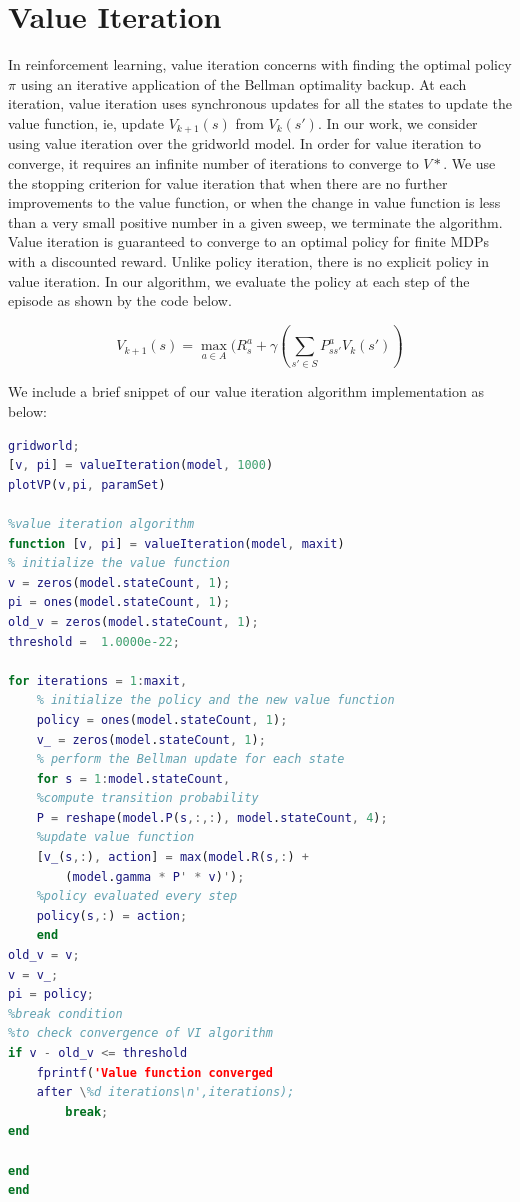 \documentclass{article}\usepackage[]{graphicx}\usepackage[]{color}
\let\Oldsection\section
\renewcommand{\section}{\FloatBarrier\Oldsection}
\theoremstyle{plain}
\begin{document}
\section{Value Iteration}

\noindent
In reinforcement learning, value iteration concerns with finding the optimal policy $\pi$ using an iterative application of the Bellman optimality backup. At each iteration, value iteration uses synchronous updates for all the states to update the value function, ie, update $V_{k+1}(s)$ from $V_k(s')$.  In our work, we consider using value iteration over the gridworld model. In order for value iteration to converge, it requires an infinite number of iterations to converge to $V*$. We use the stopping criterion for value iteration that when there are no further improvements to the value function, or when the change in value function is less than a very small positive number in a given sweep, we terminate the algorithm. Value iteration is guaranteed to converge to an optimal policy for finite MDPs with a discounted reward. Unlike policy iteration, there is no explicit policy in value iteration. In our algorithm, we evaluate the policy at each step of the episode as shown by the code below.

\begin{equation}
    V_{k+1}(s) = \max_{a \in A} (R_s^{a} + \gamma (\sum_{s' \in S} P_{ss'}^{a} V_{k}(s'))
\end{equation}


\noindent
We include a brief snippet of our value iteration algorithm implementation as below:


\begin{lstlisting}[language=Matlab, caption=Value Iteration Algorithm]
% run VI on GridWorld
gridworld;
[v, pi] = valueIteration(model, 1000)
plotVP(v,pi, paramSet)

%value iteration algorithm
function [v, pi] = valueIteration(model, maxit)
% initialize the value function
v = zeros(model.stateCount, 1);
pi = ones(model.stateCount, 1);
old_v = zeros(model.stateCount, 1);
threshold =  1.0000e-22;

for iterations = 1:maxit,
    % initialize the policy and the new value function
    policy = ones(model.stateCount, 1);
    v_ = zeros(model.stateCount, 1);
    % perform the Bellman update for each state
    for s = 1:model.stateCount,
    %compute transition probability
    P = reshape(model.P(s,:,:), model.stateCount, 4);  
    %update value function
    [v_(s,:), action] = max(model.R(s,:) + 
        (model.gamma * P' * v)');
    %policy evaluated every step
    policy(s,:) = action;        
    end   
old_v = v;    
v = v_;
pi = policy; 
%break condition
%to check convergence of VI algorithm
if v - old_v <= threshold
    fprintf('Value function converged 
    after \%d iterations\n',iterations);
        break;
end      

end
end


\end{lstlisting}
\end{document}
